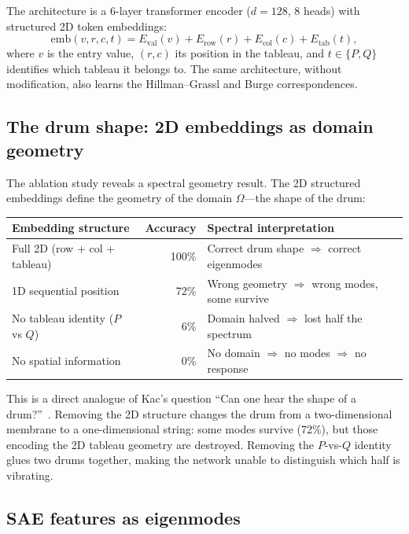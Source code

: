 \documentclass[11pt,a4paper]{article}
\begin{document}
The architecture is a 6-layer transformer encoder ($d = 128$, 8 heads) with
structured 2D token embeddings:
\[
  \mathrm{emb}(v, r, c, t) = E_{\mathrm{val}}(v) + E_{\mathrm{row}}(r)
    + E_{\mathrm{col}}(c) + E_{\mathrm{tab}}(t),
\]
where $v$ is the entry value, $(r, c)$ its position in the tableau, and
$t \in \{P, Q\}$ identifies which tableau it belongs to. The same architecture,
without modification, also learns the Hillman--Grassl and Burge correspondences.

\subsection{The drum shape: 2D embeddings as domain geometry}

The ablation study reveals a spectral geometry result. The 2D structured
embeddings define the geometry of the domain $\Omega$---the shape of the drum:

\medskip
\begin{center}
\renewcommand{\arraystretch}{1.3}
\begin{tabular}{@{}lrl@{}}
\toprule
\textbf{Embedding structure} & \textbf{Accuracy} & \textbf{Spectral interpretation} \\
\midrule
Full 2D (row + col + tableau) & 100\% & Correct drum shape $\Rightarrow$ correct eigenmodes \\
1D sequential position & 72\% & Wrong geometry $\Rightarrow$ wrong modes, some survive \\
No tableau identity ($P$ vs $Q$) & 6\% & Domain halved $\Rightarrow$ lost half the spectrum \\
No spatial information & 0\% & No domain $\Rightarrow$ no modes $\Rightarrow$ no response \\
\bottomrule
\end{tabular}
\end{center}

\medskip
This is a direct analogue of Kac's question ``Can one hear the shape of a
drum?''~\cite{kac1966}. Removing the 2D structure changes the drum from a
two-dimensional membrane to a one-dimensional string: some modes survive (72\%),
but those encoding the 2D tableau geometry are destroyed. Removing the
$P$-vs-$Q$ identity glues two drums together, making the network unable to
distinguish which half is vibrating.

\subsection{SAE features as eigenmodes}
\end{document}
